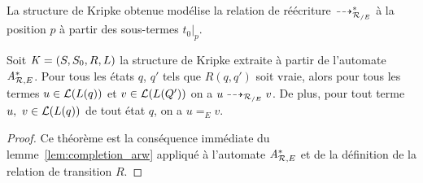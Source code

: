 La structure de Kripke obtenue modélise la relation de réécriture $\dashrightarrow_{\mathcal R_{/E}}^*$ 
à la position $p$ à partir des sous-termes $t_0|_p$.

\begin{theorem}
  Soit $\mathit K=(S, S_0, R, L)$ la structure de Kripke extraite à partir de l'automate ${\mathit A}_{\mathcal R,E}^*$.
  Pour tous les états $q$, $q'$ tels que $R(q, q')$ soit vraie, alors pour tous les termes
  $u \in \mathcal{L}(L(q))$ et $v \in \mathcal{L}(L(Q'))$ on a  $u \dashrightarrow_{\mathcal R_{/E}} v$. De plus, pour tout terme $u,\ v \in \mathcal{L}(L(q))$
  de tout état $q$, on a $u =_E v$.
\end{theorem}

\begin{proof}
  Ce théorème est la conséquence immédiate du lemme~\ref{lem:completion_arw} 
  appliqué à l'automate ${\mathit A}_{\mathcal R,E}^*$ et de la définition de la relation de transition $R$.
\end{proof}



